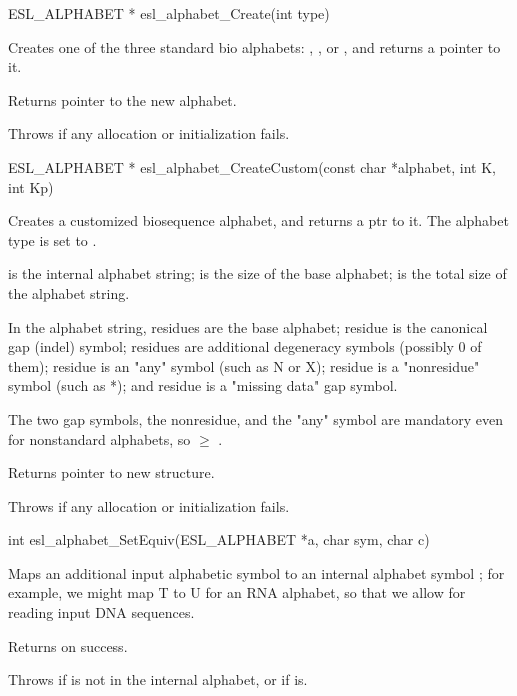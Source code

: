 \begin{sreapi}
\hypertarget{func:esl_alphabet_Create()}
{\item[ESL\_ALPHABET * esl\_alphabet\_Create(int type)]}

Creates one of the three standard bio alphabets:
, , or , and returns
a pointer to it.

Returns pointer to the new alphabet.

Throws  if any allocation or initialization fails.


\hypertarget{func:esl_alphabet_CreateCustom()}
{\item[ESL\_ALPHABET * esl\_alphabet\_CreateCustom(const char *alphabet, int K, int Kp)]}

Creates a customized biosequence alphabet,
and returns a ptr to it. The alphabet type is set 
to .

 is the internal alphabet string;
 is the size of the base alphabet;
 is the total size of the alphabet string. 

In the alphabet string, residues  are the base alphabet; 
residue  is the canonical gap (indel) symbol; 
residues  are additional degeneracy symbols (possibly 0 of them);
residue  is an "any" symbol (such as N or X); 
residue  is a "nonresidue" symbol (such as *); 
and residue  is a "missing data" gap symbol.

The two gap symbols, the nonresidue, and the "any"
symbol are mandatory even for nonstandard alphabets, so
 $\geq$ .

Returns pointer to new  structure.

Throws  if any allocation or initialization fails.


\hypertarget{func:esl_alphabet_SetEquiv()}
{\item[int esl\_alphabet\_SetEquiv(ESL\_ALPHABET *a, char sym, char c)]}

Maps an additional input alphabetic symbol  to 
an internal alphabet symbol ; for example,
we might map T to U for an RNA alphabet, so that we
allow for reading input DNA sequences.

Returns  on success.

Throws  if  is not in the internal alphabet, or if  is.



\end{sreapi}
